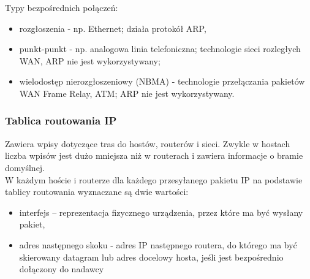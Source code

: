 \documentclass[a4paper]{article}
\begin{document}
Typy bezpośrednich połączeń:
\begin{itemize}
    \item rozgłoszenia - np. Ethernet; działa protokół ARP,
    \item punkt-punkt - np. analogowa linia telefoniczna; technologie sieci rozległych WAN, ARP nie jest wykorzystywany;
    \item wielodostęp nierozgłoszeniowy (NBMA) -  technologie przełączania pakietów WAN Frame Relay, ATM; ARP nie jest wykorzystywany.
\end{itemize}

\subsubsection{Tablica routowania IP}
Zawiera wpisy dotyczące tras do hostów, routerów i sieci. Zwykle w
hostach liczba wpisów jest dużo mniejsza niż w routerach i zawiera informacje o bramie domyślnej.\\

W każdym hoście i routerze dla każdego przesyłanego pakietu IP na podstawie tablicy
routowania wyznaczane są dwie wartości:
\begin{itemize}
    \item interfejs – reprezentacja fizycznego urządzenia, przez które ma być wysłany pakiet,
    \item adres następnego skoku - adres IP następnego routera, do którego ma być skierowany datagram lub adres
docelowy hosta, jeśli jest bezpośrednio dołączony do nadawcy\
\end{itemize}
\end{document}
